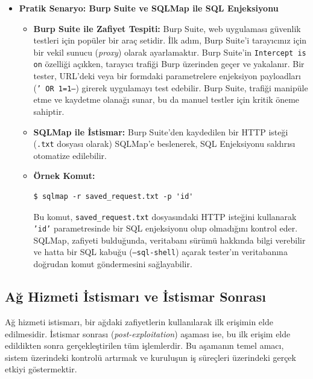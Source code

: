 \begin{itemize}
\item \textbf{Pratik Senaryo: Burp Suite ve SQLMap ile SQL Enjeksiyonu}
\begin{itemize}
\item \textbf{Burp Suite ile Zafiyet Tespiti:} Burp Suite, web uygulaması güvenlik testleri için popüler bir araç setidir. İlk adım, Burp Suite'i tarayıcınız için bir vekil sunucu (\textit{proxy}) olarak ayarlamaktır. Burp Suite'in \texttt{Intercept is on} özelliği açıkken, tarayıcı trafiği Burp üzerinden geçer ve yakalanır. Bir tester, URL'deki veya bir formdaki parametrelere enjeksiyon payloadları (\texttt{' OR 1=1--}) girerek uygulamayı test edebilir. Burp Suite, trafiği manipüle etme ve kaydetme olanağı sunar, bu da manuel testler için kritik öneme sahiptir.
\item \textbf{SQLMap ile İstismar:} Burp Suite'den kaydedilen bir HTTP isteği (\texttt{.txt} dosyası olarak) SQLMap'e beslenerek, SQL Enjeksiyonu saldırısı otomatize edilebilir.
\item \textbf{Örnek Komut:}
\begin{verbatim}
$ sqlmap -r saved_request.txt -p 'id'
\end{verbatim}
Bu komut, \texttt{saved\_request.txt} dosyasındaki HTTP isteğini kullanarak \texttt{'id'} parametresinde bir SQL enjeksiyonu olup olmadığını kontrol eder. SQLMap, zafiyeti bulduğunda, veritabanı sürümü hakkında bilgi verebilir ve hatta bir SQL kabuğu (\texttt{--sql-shell}) açarak tester'ın veritabanına doğrudan komut göndermesini sağlayabilir.
\end{itemize}
\end{itemize}

\subsection{Ağ Hizmeti İstismarı ve İstismar Sonrası}

Ağ hizmeti istismarı, bir ağdaki zafiyetlerin kullanılarak ilk erişimin elde edilmesidir. İstismar sonrası (\textit{post-exploitation}) aşaması ise, bu ilk erişim elde edildikten sonra gerçekleştirilen tüm işlemlerdir. Bu aşamanın temel amacı, sistem üzerindeki kontrolü artırmak ve kuruluşun iş süreçleri üzerindeki gerçek etkiyi göstermektir.

